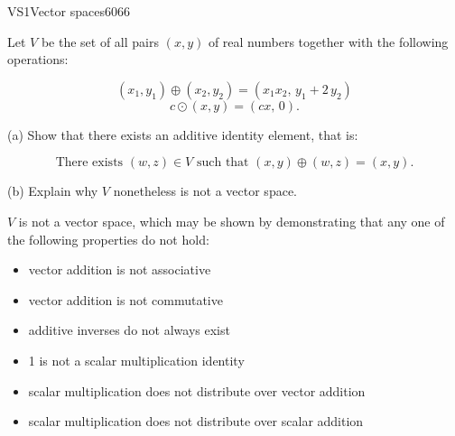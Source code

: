 \begin{exercise}{VS1}{Vector spaces}{6066} 
\begin{exerciseStatement} 

 Let \(V\) be the set of all pairs \((x,y)\) of real numbers together with the following operations: 

 \[(x_1,y_1)\oplus (x_2,y_2)=\left(x_{1} x_{2},\,y_{1} + 2 \, y_{2}\right)\]\[c \odot (x,y) =\left(c x,\,0\right).\] 

 (a) Show that there exists an additive identity element, that is: 

 \[
      \text{There exists }(w,z)\in V\text{ such that }(x,y)\oplus(w,z)=(x,y).
    \] 

 (b) Explain why \(V\) nonetheless is not a vector space. 

 \end{exerciseStatement}
 \begin{exerciseAnswer} 

 \(V\) is not a vector space, which may be shown by demonstrating that any one of the following properties do not hold: 

 

\begin{itemize}
\item vector addition is not associative
\item vector addition is not commutative
\item additive inverses do not always exist
\item 1 is not a scalar multiplication identity
\item scalar multiplication does not distribute over vector addition
\item scalar multiplication does not distribute over scalar addition
\end{itemize}

     \end{exerciseAnswer}
 \end{exercise}


